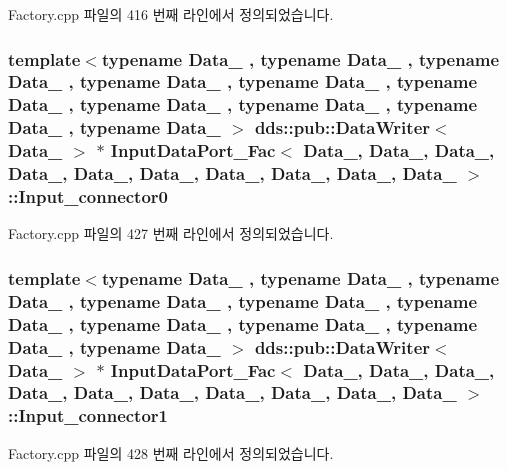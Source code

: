 Factory.\+cpp 파일의 416 번째 라인에서 정의되었습니다.

\subsubsection[{\texorpdfstring{Input\+\_\+connector0}{Input_connector0}}]{\setlength{\rightskip}{0pt plus 5cm}template$<$typename Data\+\_ , typename Data\+\_ , typename Data\+\_ , typename Data\+\_ , typename Data\+\_ , typename Data\+\_ , typename Data\+\_ , typename Data\+\_ , typename Data\+\_ , typename Data\+\_ $>$ dds\+::pub\+::\+Data\+Writer$<$ Data\+\_ $>$ $\ast$ {\bf Input\+Data\+Port\+\_\+\+Fac}$<$ Data\+\_, Data\+\_, Data\+\_, Data\+\_, Data\+\_, Data\+\_, Data\+\_, Data\+\_, Data\+\_, Data\+\_ $>$\+::Input\+\_\+connector0}\hypertarget{classInputDataPort__Fac_af0886b8147a82738272b964c85d0ca28}{}\label{classInputDataPort__Fac_af0886b8147a82738272b964c85d0ca28}


Factory.\+cpp 파일의 427 번째 라인에서 정의되었습니다.

\subsubsection[{\texorpdfstring{Input\+\_\+connector1}{Input_connector1}}]{\setlength{\rightskip}{0pt plus 5cm}template$<$typename Data\+\_ , typename Data\+\_ , typename Data\+\_ , typename Data\+\_ , typename Data\+\_ , typename Data\+\_ , typename Data\+\_ , typename Data\+\_ , typename Data\+\_ , typename Data\+\_ $>$ dds\+::pub\+::\+Data\+Writer$<$ Data\+\_ $>$ $\ast$ {\bf Input\+Data\+Port\+\_\+\+Fac}$<$ Data\+\_, Data\+\_, Data\+\_, Data\+\_, Data\+\_, Data\+\_, Data\+\_, Data\+\_, Data\+\_, Data\+\_ $>$\+::Input\+\_\+connector1}\hypertarget{classInputDataPort__Fac_a8f623a6232415353dbbc2243a3c6f148}{}\label{classInputDataPort__Fac_a8f623a6232415353dbbc2243a3c6f148}


Factory.\+cpp 파일의 428 번째 라인에서 정의되었습니다.

